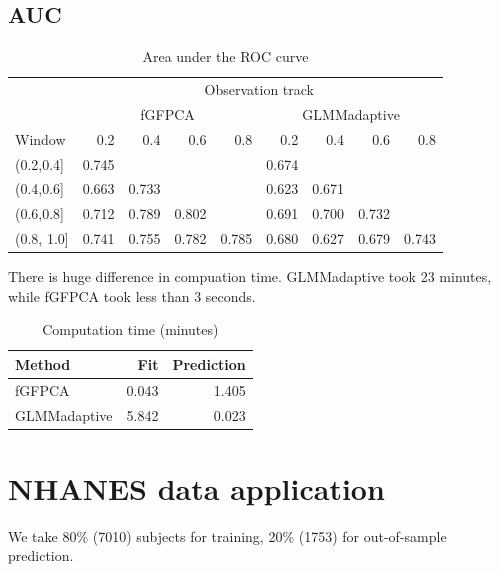\documentclass[
]{article}
\begin{document}
\hypertarget{auc-1}{%
\subsection{AUC}\label{auc-1}}

\begin{table}

\caption{\label{tab:unnamed-chunk-10}Area under the ROC curve}
\centering
\begin{tabular}[t]{lrrrrrrrr}
\toprule
\multicolumn{1}{c}{ } & \multicolumn{8}{c}{Observation track} \\
\cmidrule(l{3pt}r{3pt}){2-9}
\multicolumn{1}{c}{ } & \multicolumn{4}{c}{fGFPCA} & \multicolumn{4}{c}{GLMMadaptive} \\
\cmidrule(l{3pt}r{3pt}){2-5} \cmidrule(l{3pt}r{3pt}){6-9}
Window & 0.2 & 0.4 & 0.6 & 0.8 & 0.2 & 0.4 & 0.6 & 0.8\\
\midrule
(0.2,0.4] & 0.745 &  &  &  & 0.674 &  &  & \\
(0.4,0.6] & 0.663 & 0.733 &  &  & 0.623 & 0.671 &  & \\
(0.6,0.8] & 0.712 & 0.789 & 0.802 &  & 0.691 & 0.700 & 0.732 & \\
(0.8, 1.0] & 0.741 & 0.755 & 0.782 & 0.785 & 0.680 & 0.627 & 0.679 & 0.743\\
\bottomrule
\end{tabular}
\end{table}

There is huge difference in compuation time. GLMMadaptive took 23
minutes, while fGFPCA took less than 3 seconds.

\begin{table}

\caption{\label{tab:unnamed-chunk-11}Computation time (minutes)}
\centering
\begin{tabular}[t]{lrr}
\toprule
Method & Fit & Prediction\\
\midrule
fGFPCA & 0.043 & 1.405\\
GLMMadaptive & 5.842 & 0.023\\
\bottomrule
\end{tabular}
\end{table}

\hypertarget{nhanes-data-application}{%
\section{NHANES data application}\label{nhanes-data-application}}

We take 80\% (7010) subjects for training, 20\% (1753) for out-of-sample
prediction.
\end{document}
